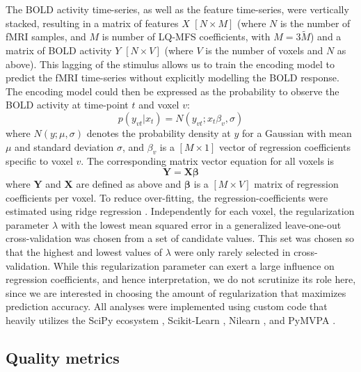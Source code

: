 The BOLD activity time-series, as well as the feature time-series, were vertically stacked, resulting in a matrix of features $X$ $[N\times M]$ (where $N$ is the number of f{MRI} samples, and $M$ is number of LQ-MFS coefficients, with $M=3\widetilde{M}$) and a matrix of BOLD activity $Y$ $[N\times V]$ (where $V$ is the number of voxels and $N$ as above). This lagging of the stimulus allows us to train the encoding model to predict the f{MRI} time-series without explicitly modelling the BOLD response. The encoding model could then be expressed as the probability to observe the BOLD activity at time-point $t$ and voxel $v$:
\begin{equation}
  \label{eq:encmo}
  p(y_{vt}|x_{t}) = N(y_{vt};x_{t}\beta_{v},\sigma)
\end{equation}
where $N(y;\mu,\sigma)$ denotes the probability density at $y$ for a
Gaussian with mean $\mu$ and standard deviation $\sigma$, and $\beta_{v}$ is a
$[M\times1]$ vector of regression coefficients specific to voxel $v$. The corresponding matrix vector equation for all voxels is
\begin{equation}
    \label{eq:encmat}
    \mathbf{Y} = \mathbf{X}\mathbf{\beta}
\end{equation}
where $\mathbf{Y}$ and $\mathbf{X}$ are defined as above and $\mathbf{\beta}$ is a $[M \times V]$ matrix of regression coefficients per voxel.
To reduce over-fitting, the regression-coefficients were estimated using ridge regression \citep{HK70}. Independently for each voxel, the regularization parameter $\lambda$ with the lowest mean squared error in a generalized leave-one-out cross-validation \citep{GHW79} was chosen from a set of candidate values. This set was chosen so that the highest and lowest values of $\lambda$ were only rarely selected in cross-validation. While this regularization parameter can exert a large influence on regression coefficients, and hence interpretation, we do not scrutinize its role here, since we are interested in choosing the amount of regularization that maximizes prediction accuracy.
All analyses were implemented using custom code that heavily utilizes the SciPy ecosystem \citep{jones2014scipy}, Scikit-Learn \citep{PVG+11}, Nilearn \citep{abraham2014machine}, and PyMVPA \citep{HHS09b}.

\subsection*{Quality metrics} 

